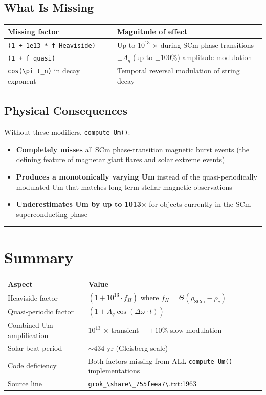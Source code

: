 \documentclass[12pt,a4paper]{article}
\begin{document}
\subsection{What Is Missing}

\begin{table}[H]
\centering
\small
\begin{tabularx}{\linewidth}{@{}>{\raggedright\arraybackslash}X>{\raggedright\arraybackslash}X@{}}
\toprule
Missing factor & Magnitude of effect \tabularnewline
\midrule
\texttt{(1 + 1e13 * f\_Heaviside)} & Up to $10^{13}$ $\times$ during SCm phase transitions \tabularnewline
\texttt{(1 + f\_quasi)} & $\pm A_q$ (up to $\pm 100\%$) amplitude modulation \tabularnewline
\texttt{cos(\textbackslash pi t\_n)} in decay exponent & Temporal reversal modulation of string decay \tabularnewline
\bottomrule
\end{tabularx}
\end{table}

\subsection{Physical Consequences}

Without these modifiers, \texttt{compute\_Um()}:

\begin{itemize}
  \item \textbf{Completely misses} all SCm phase-transition magnetic burst events (the defining feature of magnetar giant flares and solar extreme events)
  \item \textbf{Produces a monotonically varying Um} instead of the quasi-periodically modulated Um that matches long-term stellar magnetic observations
  \item \textbf{Underestimates Um by up to 1013$\times$} for objects currently in the SCm superconducting phase
\end{itemize}

\medskip\hrule\medskip

\section{Summary}

\begin{table}[H]
\centering
\small
\begin{tabularx}{\linewidth}{@{}>{\raggedright\arraybackslash}X>{\raggedright\arraybackslash}X@{}}
\toprule
Aspect & Value \tabularnewline
\midrule
Heaviside factor & $(1 + 10^{13} \cdot f_H)$ where $f_H = \Theta(\rho_{\text{SCm}} - \rho_c)$ \tabularnewline
Quasi-periodic factor & $(1 + A_q \cos(\Delta\omega \cdot t))$ \tabularnewline
Combined Um amplification & $10^{13}$ $\times$ transient + $\pm 10\%$ slow modulation \tabularnewline
Solar beat period & $\sim 434$ yr (Gleisberg scale) \tabularnewline
Code deficiency & Both factors missing from ALL \texttt{compute\_Um()} implementations \tabularnewline
Source line & \texttt{grok\_\textbackslash {share\textbackslash \_755feea7\textbackslash }}.txt:1963 \tabularnewline
\bottomrule
\end{tabularx}
\end{table}
\end{document}
